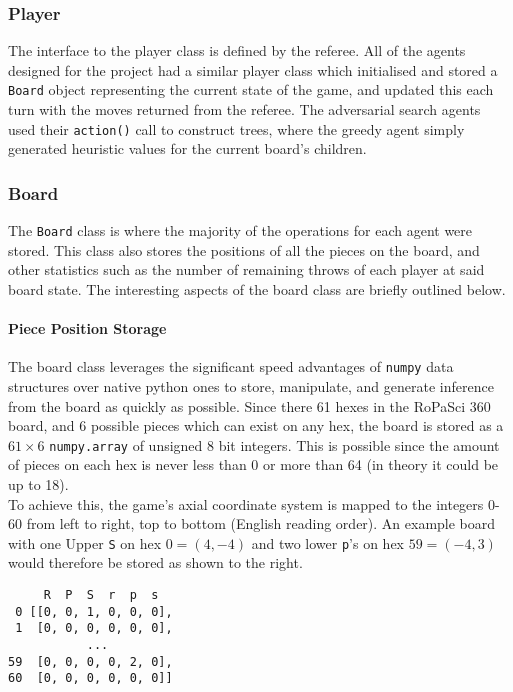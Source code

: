 \documentclass{article}
\begin{document}
\subsubsection{Player}
The interface to the player class is defined by the referee. All of the agents designed for the project had a similar player class which initialised and stored a \verb|Board| object representing the current state of the game, and updated this each turn with the moves returned from the referee. The adversarial search agents used their \verb|action()| call to construct trees, where the greedy agent simply generated heuristic values for the current board's children.

\subsubsection{Board}
The \verb|Board| class is where the majority of the operations for each agent were stored. This class also stores the positions of all the pieces on the board, and other statistics such as the number of remaining throws of each player at said board state. The interesting aspects of the board class are briefly outlined below.\\[4mm]
\begin{minipage}{0.73\textwidth}
\paragraph{Piece Position Storage}
The board class leverages the significant speed advantages of \verb|numpy| data structures over native python ones to store, manipulate, and generate inference from the board as quickly as possible. Since there 61 hexes in the RoPaSci 360 board, and 6 possible pieces which can exist on any hex, the board is stored as a $61 \times 6$ \verb|numpy.array| of unsigned 8 bit integers. This is possible since the amount of pieces on each hex is never less than 0 or more than 64 (in theory it could be up to 18).\\[2mm]
To achieve this, the game's axial coordinate system is mapped to the integers 0-60 from left to right, top to bottom (English reading order). An example board with one Upper \verb|S| on hex $0 = (4, -4)$ and two lower \verb|p|'s on hex $59 = (-4, 3)$ would therefore be stored as shown to the right.
\end{minipage}
\hfill
\begin{minipage}{0.25\textwidth}
\begin{verbatim}
     R  P  S  r  p  s
 0 [[0, 0, 1, 0, 0, 0],
 1  [0, 0, 0, 0, 0, 0],
           ...
59  [0, 0, 0, 0, 2, 0],
60  [0, 0, 0, 0, 0, 0]]
\end{verbatim}
\end{minipage}
\end{document}

